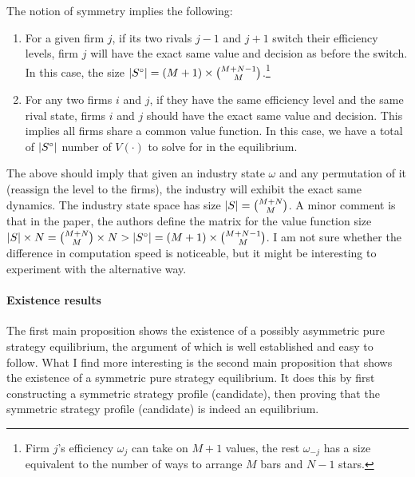 \documentclass[12pt]{article}[margin=1in]
\begin{document}
The notion of symmetry implies the following:
\begin{enumerate}
    \item For a given firm $j$, if its two rivals $j-1$ and $j+1$ switch their efficiency levels, firm $j$ will have the exact same value and decision as before the switch. In this case, the size $\left| S^\circ\right| = (M+1) \times \binom{M+N-1}{M}$.\footnote{Firm $j$'s efficiency $\omega_j$ can take on $M+1$ values, the rest $\omega_{-j}$ has a size equivalent to the number of ways to arrange $M$ bars and $N-1$ stars.}
    \item For any two firms $i$ and $j$, if they have the same efficiency level and the same rival state, firms $i$ and $j$ should have the exact same value and decision. This implies all firms share a common value function. In this case, we have a total of $\left| S^\circ\right|$ number of $V(\cdot)$ to solve for in the equilibrium.
\end{enumerate}
The above should imply that given an industry state $\omega$ and any permutation of it (reassign the level to the firms), the industry will exhibit the exact same dynamics. The industry state space has size $\left| S\right|=\binom{M+N}{M}$. A minor comment is that in the paper, the authors define the matrix for the value function size $\left| S\right| \times N = \binom{M+N}{M} \times N > \left| S^\circ\right| = (M+1) \times \binom{M+N-1}{M}$. I am not sure whether the difference in computation speed is noticeable, but it might be interesting to experiment with the alternative way.

\paragraph{Existence results} The first main proposition shows the existence of a possibly asymmetric pure strategy equilibrium, the argument of which is well established and easy to follow. What I find more interesting is the second main proposition that shows the existence of a symmetric pure strategy equilibrium. It does this by first constructing a symmetric strategy profile (candidate), then proving that the symmetric strategy profile (candidate) is indeed an equilibrium.
\end{document}
